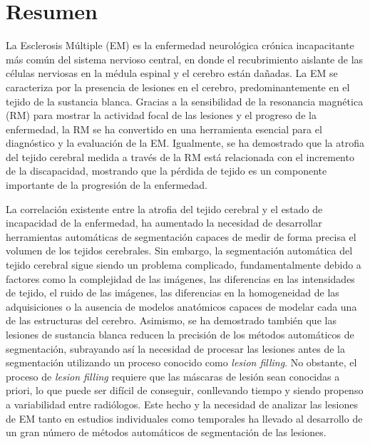 \chapter*{Resumen}

La Esclerosis Múltiple (EM) es la enfermedad neurológica crónica incapacitante más común del sistema nervioso central, en donde el recubrimiento aislante de las células nerviosas en la médula espinal y el cerebro están dañadas. La EM se caracteriza por la presencia de lesiones en el cerebro, predominantemente en el tejido de la sustancia blanca. Gracias a la sensibilidad de la resonancia magnética (RM) para mostrar la actividad focal de las lesiones y el progreso de la enfermedad, la RM se ha convertido en una herramienta esencial para el diagnóstico y la evaluación de la EM. Igualmente, se ha demostrado que la atrofia del tejido cerebral medida a través de la RM está relacionada con el incremento de la discapacidad, mostrando que la pérdida de tejido es un componente importante de la progresión de la enfermedad.

La correlación existente entre la atrofia del tejido cerebral y el estado de incapacidad de la enfermedad, ha aumentado la necesidad de desarrollar 
herramientas automáticas de segmentación capaces de medir de forma precisa el volumen de los tejidos cerebrales. Sin embargo, la segmentación automática del tejido cerebral sigue siendo un problema complicado, fundamentalmente debido a factores como la complejidad de las imágenes, las diferencias en las intensidades de tejido, el ruido de las imágenes, las diferencias en la homogeneidad de las adquisiciones o la ausencia de modelos anatómicos capaces de modelar cada una de las estructuras del cerebro. Asimismo, se ha demostrado también que las lesiones de sustancia blanca reducen la precisión de los métodos automáticos de segmentación, subrayando así la necesidad de procesar las lesiones antes de la segmentación utilizando un proceso conocido como \textit{lesion filling}. No obstante, el proceso de \textit{lesion filling} requiere que las máscaras de lesión sean conocidas a priori, lo que puede ser difícil de conseguir, conllevando tiempo y siendo propenso a variabilidad entre radiólogos. Este hecho y la necesidad de analizar las lesiones de EM tanto en estudios individuales como temporales ha llevado al desarrollo de un 
gran número de métodos automáticos de segmentación de las lesiones. 

